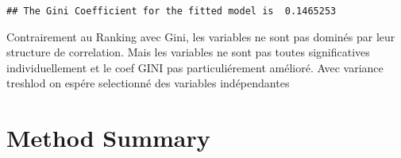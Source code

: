 \documentclass[]{book}
\newenvironment{Shaded}{\begin{snugshade}}{\end{snugshade}}
\newcommand{\KeywordTok}[1]{\textcolor[rgb]{0.13,0.29,0.53}{\textbf{#1}}}
\newcommand{\DataTypeTok}[1]{\textcolor[rgb]{0.13,0.29,0.53}{#1}}
\newcommand{\StringTok}[1]{\textcolor[rgb]{0.31,0.60,0.02}{#1}}
\newcommand{\OperatorTok}[1]{\textcolor[rgb]{0.81,0.36,0.00}{\textbf{#1}}}
\newcommand{\NormalTok}[1]{#1}
\theoremstyle{definition}
\theoremstyle{definition}
\theoremstyle{definition}
\theoremstyle{remark}
\begin{document}
\begin{Shaded}
\end{Shaded}

\begin{verbatim}
## The Gini Coefficient for the fitted model is  0.1465253
\end{verbatim}

Contrairement au Ranking avec Gini, les variables ne sont pas dominés
par leur structure de correlation. Mais les variables ne sont pas toutes
significatives individuellement et le coef GINI pas particuliérement
amélioré. Avec variance treshlod on espére selectionné des variables
indépendantes

\section{Method Summary}\label{method-summary}
\end{document}
